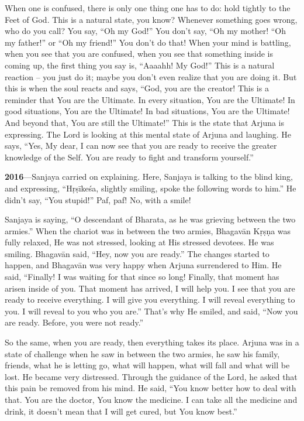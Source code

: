 When one is confused, there is only one thing one has to do: hold tightly to the Feet of God. This is a natural state, you know? Whenever something goes wrong, who do you call? You say, “Oh my God!” You don’t say, “Oh my mother! “Oh my father!” or “Oh my friend!” You don’t do that! When your mind is battling, when you see that you are confused, when you see that something inside is coming up, the first thing you say is, “Aaaahh! My God!” This is a natural reaction – you just do it; maybe you don’t even realize that you are doing it. But this is when the soul reacts and says, “God, you are the creator! This is a reminder that You are the Ultimate. In every situation, You are the Ultimate! In good situations, You are the Ultimate! In bad situations, You are the Ultimate! And beyond that, You are still the Ultimate!” This is the state that Arjuna is expressing. The Lord is looking at this mental state of Arjuna and laughing. He says, “Yes, My dear, I can now see that you are ready to receive the greater knowledge of the Self. You are ready to fight and transform yourself.”

\textbf{2016}---Sanjaya carried on explaining. Here, Sanjaya is talking to the blind king, and expressing, “Hṛṣīkeśa, slightly smiling, spoke the following words to him.” He didn’t say, “You stupid!” Paf, paf! No, with a smile!

Sanjaya is saying, “O descendant of Bharata, as he was grieving between the two armies.” When the chariot was in between the two armies, Bhagavān Kṛṣṇa was fully relaxed, He was not stressed, looking at His stressed devotees. He was smiling. Bhagavān said, “Hey, now you are ready.” The changes started to happen, and Bhagavān was very happy when Arjuna surrendered to Him. He said, “Finally! I was waiting for that since so long! Finally, that moment has arisen inside of you. That moment has arrived, I will help you. I see that you are ready to receive everything. I will give you everything. I will reveal everything to you. I will reveal to you who you are.” That’s why He smiled, and said, “Now you are ready. Before, you were not ready.”

So the same, when you are ready, then everything takes its place. Arjuna was in a state of challenge when he saw in between the two armies, he saw his family, friends, what he is letting go, what will happen, what will fall and what will be lost. He became very distressed. Through the guidance of the Lord, he asked that this pain be removed from his mind. He said, “You know better how to deal with that. You are the doctor, You know the medicine. I can take all the medicine and drink, it doesn’t mean that I will get cured, but You know best.”


